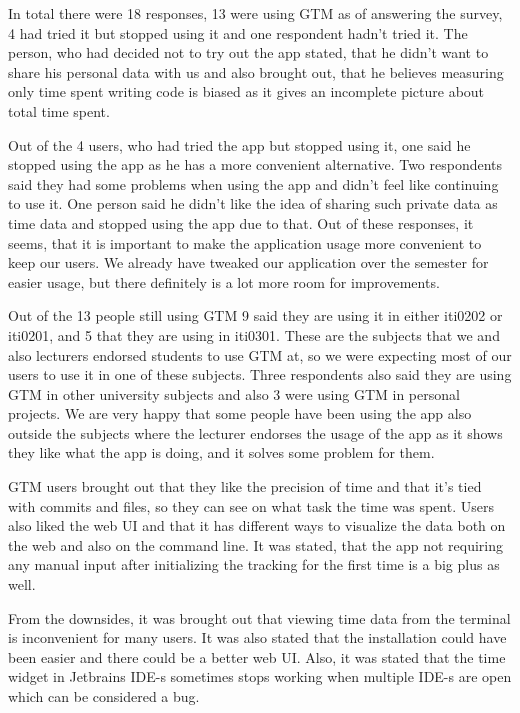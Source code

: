 In total there were 18 responses, 13 were using GTM as of answering the survey, 4 had tried it but stopped using it and one respondent hadn't tried it.
The person, who had decided not to try out the app stated, that he didn't want to share his personal data with us and also brought out,
that he believes measuring only time spent writing code is biased as it gives an incomplete picture about total time spent.

Out of the 4 users, who had tried the app but stopped using it, one said he stopped using the app as he has a more convenient alternative.
Two respondents said they had some problems when using the app and didn't feel like continuing to use it.
One person said he didn't like the idea of sharing such private data as time data and stopped using the app due to that.
Out of these responses, it seems, that it is important to make the application usage more convenient to keep our users.
We already have tweaked our application over the semester for easier usage, but there definitely is a lot more room for improvements.

Out of the 13 people still using GTM 9 said they are using it in either iti0202 or iti0201, and 5 that they are using in iti0301.
These are the subjects that we and also lecturers endorsed students to use GTM at, so we were expecting most of our
users to use it in one of these subjects.
Three respondents also said they are using GTM in other university subjects and also 3 were using GTM in personal projects.
We are very happy that some people have been using the app also outside the subjects where the lecturer endorses the usage of the app
as it shows they like what the app is doing, and it solves some problem for them.

GTM users brought out that they like the precision of time and that it's tied with commits and files, so they can see
on what task the time was spent.
Users also liked the web UI and that it has different ways to visualize the data both on the web and also on the command line.
It was stated, that the app not requiring any manual input after initializing the tracking for the first time is a big plus as well.

From the downsides, it was brought out that viewing time data from the terminal is inconvenient for many users.
It was also stated that the installation could have been easier and there could be a better web UI.
Also, it was stated that the time widget in Jetbrains IDE-s sometimes stops working when multiple IDE-s are open
which can be considered a bug.

